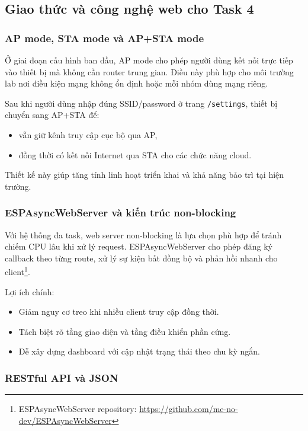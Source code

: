 \subsection{Giao thức và công nghệ web cho Task 4}

\subsubsection*{AP mode, STA mode và AP+STA mode}

Ở giai đoạn cấu hình ban đầu, AP mode cho phép người dùng kết nối trực tiếp vào thiết bị mà không cần router trung gian. Điều này phù hợp cho môi trường lab nơi điều kiện mạng không ổn định hoặc mỗi nhóm dùng mạng riêng.

Sau khi người dùng nhập đúng SSID/password ở trang \texttt{/settings}, thiết bị chuyển sang AP+STA để:
\begin{itemize}
    \item vẫn giữ kênh truy cập cục bộ qua AP,
    \item đồng thời có kết nối Internet qua STA cho các chức năng cloud.
\end{itemize}

Thiết kế này giúp tăng tính linh hoạt triển khai và khả năng bảo trì tại hiện trường.

\subsubsection*{ESPAsyncWebServer và kiến trúc non-blocking}

Với hệ thống đa task, web server non-blocking là lựa chọn phù hợp để tránh chiếm CPU lâu khi xử lý request. ESPAsyncWebServer cho phép đăng ký callback theo từng route, xử lý sự kiện bất đồng bộ và phản hồi nhanh cho client\footnote{ESPAsyncWebServer repository: \url{https://github.com/me-no-dev/ESPAsyncWebServer}}.

Lợi ích chính:
\begin{itemize}
    \item Giảm nguy cơ treo khi nhiều client truy cập đồng thời.
    \item Tách biệt rõ tầng giao diện và tầng điều khiển phần cứng.
    \item Dễ xây dựng dashboard với cập nhật trạng thái theo chu kỳ ngắn.
\end{itemize}

\subsubsection*{RESTful API và JSON}

